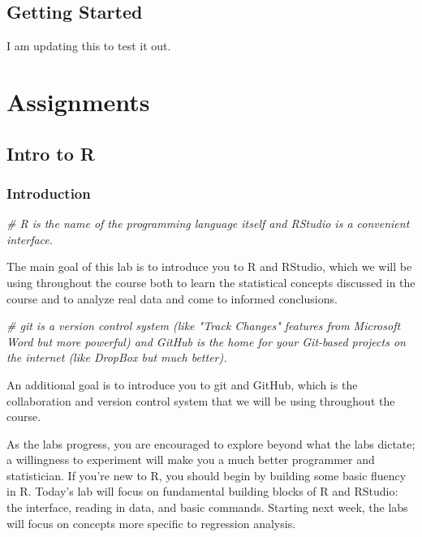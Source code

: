 \documentclass[]{book}
\newenvironment{Shaded}{\begin{snugshade}}{\end{snugshade}}
\newcommand{\CommentTok}[1]{\textcolor[rgb]{0.56,0.35,0.01}{\textit{#1}}}
\begin{document}
\chapter{Getting Started}\label{getstarted}

I am updating this to test it out.

\part{Assignments}\label{part-assignments}

\chapter{Intro to R}\label{intro-to-r}

\section{Introduction}\label{introduction-1}

\begin{Shaded}
\begin{Highlighting}[]
\CommentTok{# R is the name of the programming language itself and RStudio is a convenient interface.}
\end{Highlighting}
\end{Shaded}

The main goal of this lab is to introduce you to R and RStudio, which we
will be using throughout the course both to learn the statistical
concepts discussed in the course and to analyze real data and come to
informed conclusions.

\begin{Shaded}
\begin{Highlighting}[]
\CommentTok{# git is a version control system (like "Track Changes" features from Microsoft Word but more powerful) and GitHub is the home for your Git-based projects on the internet (like DropBox but much better).}
\end{Highlighting}
\end{Shaded}

An additional goal is to introduce you to git and GitHub, which is the
collaboration and version control system that we will be using
throughout the course.

As the labs progress, you are encouraged to explore beyond what the labs
dictate; a willingness to experiment will make you a much better
programmer and statistician. If you're new to R, you should begin by
building some basic fluency in R. Today's lab will focus on fundamental
building blocks of R and RStudio: the interface, reading in data, and
basic commands. Starting next week, the labs will focus on concepts more
specific to regression analysis.
\end{document}
